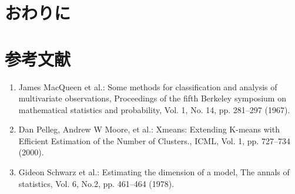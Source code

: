 \documentclass[10pt,a4j,twocolumn]{ltjsarticle}
\begin{document}
\section{おわりに}

\section{参考文献}
\begin{enumerate}
\renewcommand{\labelenumi}{\arabic{enumi})}
  \item James MacQueen et al.: 
    Some methods for classification and analysis of multivariate observations,
    Proceedings of the fifth Berkeley symposium on mathematical statistics and probability, 
    Vol. 1, No. 14, pp. 281--297 (1967).
  \item Dan Pelleg, Andrew W Moore, et al.:
    Xmeans: Extending K-means with Efficient Estimation of the Number of Clusters.,
    ICML, Vol. 1, pp. 727--734 (2000).
  \item Gideon Schwarz et al.:
    Estimating the dimension of a model,
    The annals of statistics, Vol. 6, No.2, pp. 461--464 (1978).
\end{enumerate}
\end{document}
